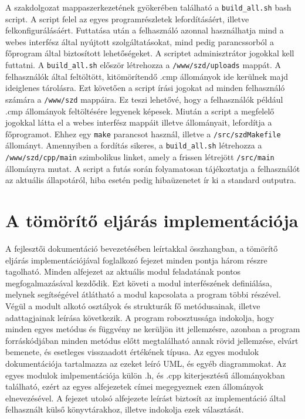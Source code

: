 \documentclass[oneside,titlepage,12pt,a4paper]{report}
\begin{document}
\par A szakdolgozat mappaszerkezetének gyökerében található a \texttt{build\_all.sh} bash script. A script felel az egyes programrészletek lefordításáért, illetve felkonfigurálásáért. Futtatása után a felhasználó azonnal használhatja mind a webes interfész által nyújtott szolgáltatásokat, mind pedig parancssorból a főprogram által biztosított lehetőségeket. A scriptet adminisztrátor jogokkal kell futtatni. A \texttt{build\_all.sh} először létrehozza a \texttt{/www/szd/uploads} mappát. A felhasználók által feltöltött, kitömörítendő .cmp állományok ide kerülnek majd ideiglenes tárolásra. Ezt követően a script 
írási jogokat ad minden felhasználó számára a \texttt{/www/szd} mappáira. Ez teszi lehetővé, hogy a felhasználók például .cmp állományok feltöltésére legyenek képesek. Miután a script a megfelelő jogokkal látta el a webes interfész mappáit illetve állományait, lefordítja a főprogramot. Ehhez egy \texttt{make} parancsot használ, illetve a \texttt{/src/szdMakefile} állományt. Amennyiben a fordítás sikeres, a \texttt{build\_all.sh} létrehozza a \texttt{/www/szd/cpp/main} szimbolikus linket, amely a frissen létrejött \texttt{/src/main} állományra mutat. A script a futás során folyamatosan tájékoztatja a felhasználót az aktuális állapotáról, hiba esetén pedig hibaüzenetet ír ki a standard outputra.  

\section{A tömörítő eljárás implementációja}

A fejlesztői dokumentáció bevezetésében leírtakkal összhangban, a tömörítő eljárás implementációjával foglalkozó fejezet minden pontja három részre tagolható. Minden alfejezet az aktuális modul feladatának pontos megfogalmazásával kezdődik. Ezt követi a modul interfészének definiálása, melynek segítségével átlátható a modul kapcsolata a program többi részével. Végül a modult alkotó osztályok és strukturák fő metódusainak, illetve adattagjainak leírása következik. A program robosztussága indokolja, hogy minden egyes metódus és függvény ne kerüljön itt jellemzésre, azonban a program forráskódjában minden metódus előtt megtalálható annak rövid jellemzése, elvárt bemenete, és esetleges visszaadott értékének típusa. Az egyes modulok dokumentációja tartalmazza az ezeket leíró UML, és egyéb diagrammokat. Az egyes modulok imlpementációja külön .h, és .cpp kiterjesztésű állományokban található, ezért az egyes alfejezetek címei megegyeznek ezen állományok elnevezésével. A fejezet utolsó alfejezete leírást biztosít az implementáció által felhasznált külső könyvtárakhoz, illetve indokolja ezek választását.
\end{document}
